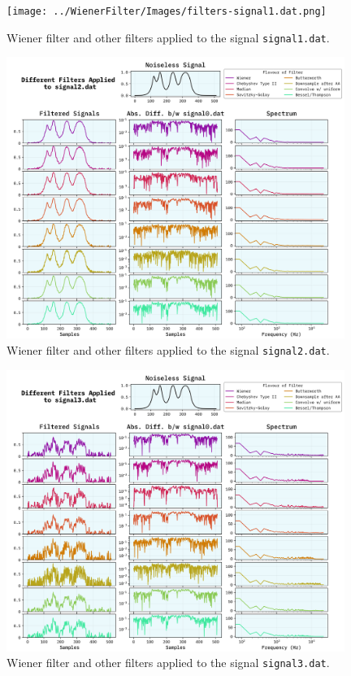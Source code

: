\documentclass[10pt, titlepage, a4paper]{article}
\begin{document}
\begin{figure}[H]
    \centering
    \texttt{[image: ../WienerFilter/Images/filters-signal1.dat.png]}
    \caption{Wiener filter and other filters applied to the signal \texttt{signal1.dat}.}
    \label{fig:other-filters-1}
\end{figure}

\begin{figure}[H]
    \centering
    \includegraphics[width=0.98\textwidth]{../WienerFilter/Images/filters-signal2.dat.png}
    \caption{Wiener filter and other filters applied to the signal \texttt{signal2.dat}.}
    \label{fig:other-filters-2}
\end{figure}

\begin{figure}[H]
    \centering
    \includegraphics[width=0.98\textwidth]{../WienerFilter/Images/filters-signal3.dat.png}
    \caption{Wiener filter and other filters applied to the signal \texttt{signal3.dat}.}
    \label{fig:other-filters-3}
\end{figure}
\end{document}
